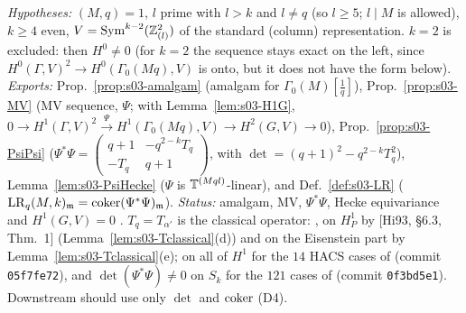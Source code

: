 \begin{interface}\label{if:s03-amalgam}
\emph{Hypotheses:} $(M,q)=1$, $l$ prime with $l>k$ and $l\ne q$ (so $l\ge5$; $l\mid M$ is allowed), $k\ge4$ even, $V=\mathrm{Sym}^{k-2}(\mathbb{Z}_{(l)}^2)$ of the standard (column)
representation. $k=2$ is excluded: then $H^0\ne0$ (for $k=2$ the sequence stays exact on the left, since $H^0(\Gamma,V)^2\to H^0(\Gamma_0(Mq),V)$ is onto, but it does
not have the form below).
\emph{Exports:} Prop.~\ref{prop:s03-amalgam} (amalgam for $\Gamma_0(M)[\frac1q]$), Prop.~\ref{prop:s03-MV} (MV sequence, $\Psi$; with
Lemma~\ref{lem:s03-H1G}, $0\to H^1(\Gamma,V)^2\xrightarrow\Psi H^1(\Gamma_0(Mq),V)\to H^2(G,V)\to0$),
Prop.~\ref{prop:s03-PsiPsi} ($\Psi^*\Psi=\left(\begin{smallmatrix}q+1&-q^{2-k}T_q\\-T_q&q+1\end{smallmatrix}\right)$, with
$\det=(q+1)^2-q^{2-k}T_q^2$), Lemma~\ref{lem:s03-PsiHecke} ($\Psi$ is $\mathbb{T}^{(Mql)}$-linear), and Def.~\ref{def:s03-LR} ($\mathrm{LR}_q(M,k)_{\mathfrak{m}}=\operatorname{coker}(\Psi^*\Psi)_{\mathfrak{m}}$).
\emph{Status:} amalgam, MV, $\Psi^*\Psi$, Hecke equivariance and $H^1(G,V)=0$ \stpmc. $T_q=T_{\alpha'}$ is the classical operator: \stpmc{}, on $H^1_P$ by
[Hi93, \S6.3, Thm.~1] (Lemma~\ref{lem:s03-Tclassical}(d)) and on the Eisenstein part by Lemma~\ref{lem:s03-Tclassical}(e); \stcomp{} on all of $H^1$ for the $14$ HACS
cases of  (commit \texttt{05f7fe72}), and $\det(\Psi^*\Psi)\ne0$ on $S_k$ for the $121$ cases of
 (commit \texttt{0f3bd5e1}). Downstream should use only $\det$ and $\operatorname{coker}$ (D4).
\end{interface}
